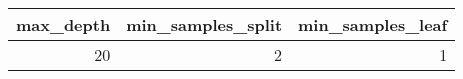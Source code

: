 \begin{tabular}{rrr}
\toprule
max_depth & min_samples_split & min_samples_leaf \\
\midrule
20 & 2 & 1 \\
\bottomrule
\end{tabular}
